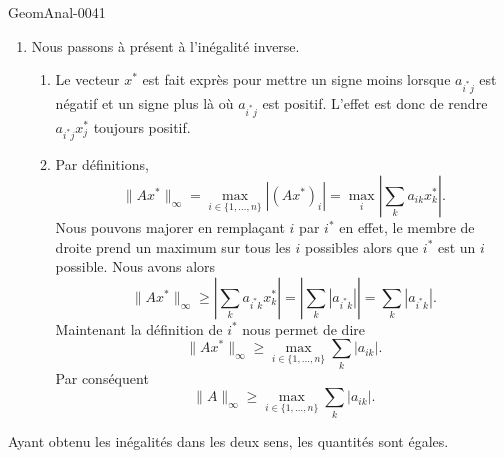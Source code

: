 \begin{corrige}{GeomAnal-0041}
\begin{enumerate}
        \item
            Nous passons à présent à l'inégalité inverse.
            \begin{enumerate}
                \item
                    Le vecteur \( x^*\) est fait exprès pour mettre un signe moins lorsque \( a_{i^*j}\) est négatif et un signe plus là où \( a_{i^*j}\) est positif. L'effet est donc de rendre \( a_{i^*j}x^*_j\) toujours positif.
                \item
                    Par définitions,
                    \begin{equation}
                        \| Ax^* \|_{\infty}=\max_{i\in\{ 1,\ldots,n \}}| (Ax^*)_i |=\max_i\left| \sum_k a_{ik}x^*_k \right| .
                    \end{equation}
                    Nous pouvons majorer en remplaçant \( i\) par \( i^*\) en effet, le membre de droite prend un maximum sur tous les \( i\) possibles alors que \( i^*\) est un \( i\) possible. Nous avons alors
                    \begin{equation}
                        \| Ax^* \|_{\infty}\geq\left| \sum_ka_{i^*k}x^*_k \right| =\left| \sum_k| a_{i^*k} | \right| =\sum_k| a_{i^*k} |.
                    \end{equation}
                    Maintenant la définition de \( i^*\) nous permet de dire
                    \begin{equation}
                        \| Ax^* \|_{\infty}\geq \max_{i\in\{ 1,\ldots,n \}}\sum_k| a_{ik} |.
                    \end{equation}
                    Par conséquent
                    \begin{equation}
                        \| A \|_{\infty}\geq\max_{i\in\{ 1,\ldots,n \}}\sum_k| a_{ik} |.
                    \end{equation}
            \end{enumerate}
    \end{enumerate}
    Ayant obtenu les inégalités dans les deux sens, les quantités sont égales.

\end{corrige}
